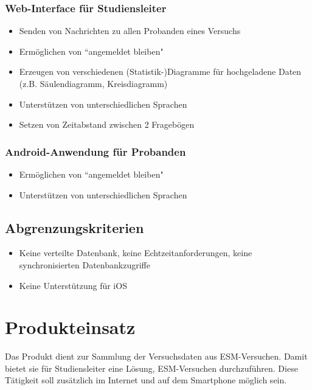\documentclass[a4paper]{scrreprt}
\begin{document}
            \subsection{\gls{Web-Interface} f\"ur \gls{Studiensleiter}}
                \begin{itemize}
                    \item Senden von Nachrichten zu allen \gls{Proband}en eines Versuchs
                    \item Erm\"oglichen von ``angemeldet bleiben"
                    \item Erzeugen von verschiedenen (Statistik-)Diagramme f\"ur hochgeladene Daten (z.B. S\"aulendiagramm, Kreisdiagramm)
                    \item Unterst\"utzen von unterschiedlichen Sprachen
                    \item Setzen von Zeitabstand zwischen 2 Frageb\"ogen

                \end{itemize}

            \subsection{Android-Anwendung f\"ur \gls{Proband}en}
                \begin{itemize}
                    \item Erm\"oglichen von ``angemeldet bleiben"
                    \item Unterst\"utzen von unterschiedlichen Sprachen
                \end{itemize}
                \vspace*{0.5cm}


        \section{Abgrenzungskriterien}
            \begin{itemize}
                \item Keine verteilte Datenbank, keine Echtzeitanforderungen, keine synchronisierten Datenbankzugriffe
                \item Keine Unterst\"utzung f\"ur iOS
            \end{itemize}

    \chapter{Produkteinsatz}
        Das Produkt dient zur Sammlung der Versuchsdaten aus ESM-Versuchen. Damit bietet sie für \gls{Studiensleiter} eine Lösung, ESM-Versuchen durchzuführen. Diese Tätigkeit soll zusätzlich im Internet und auf dem Smartphone möglich sein.
\end{document}
